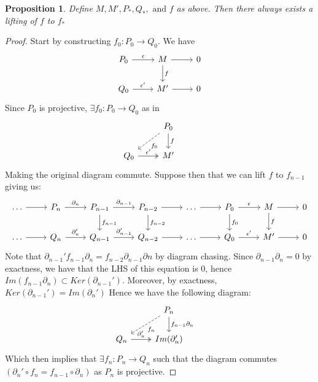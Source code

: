\documentclass[12pt]{book}
\newtheorem{proposition}[theorem]{Proposition}
\theoremstyle{definition}
\begin{document}
\begin{proposition}\label{Lifting of Chain Complexes}
    Define $M, M', P_*, Q_*, \text{ and } f$ as above. Then there always exists a lifting of $f$ to $f_*$
\end{proposition}
\begin{proof}
    Start by constructing $f_0 : P_0 \to Q_0$. We have 
    \[
    \begin{tikzcd}
        P_0 \arrow[r, "\epsilon"]  & M \arrow[r] \arrow[d, "f"]
        & 0\\
        Q_0 \arrow[r, "\epsilon'"] & M' \arrow[r] 
        & 0 
    \end{tikzcd}
    \]
    Since $P_0$ is projective, $\exists f_0 : P_0 \to Q_0$ as in 
    \[
    \begin{tikzcd}
    & P_0 \arrow[ld, dashed, "f_0"] \arrow[d, "f"] & \\
    Q_0 \arrow[r, two heads, "\epsilon'"] & M' &
    \end{tikzcd}
    \]
    Making the original diagram commute. Suppose then that we can lift $f$ to $f_{n-1}$ giving us: 
    \[
    \begin{tikzcd}
    \dots \arrow[r] & P_n \arrow[r, "\partial_n"]  
    & P_{n-1} \arrow[r, "\partial_{n-1}"] \arrow[d, "f_{n-1}"]
    & P_{n-2} \arrow[r] \arrow[d, "f_{n-2}"] 
    & \dots \arrow[r]
    & P_0 \arrow[r, "\epsilon"] \arrow[d, "f_0"]
    & M \arrow[r] \arrow[d, "f"]
    & 0 \\
    \dots \arrow[r] & Q_n \arrow[r, "\partial_n'"] 
    & Q_{n-1} \arrow[r, "\partial_{n-1}'"]
    & Q_{n-2} \arrow[r]
    & \dots \arrow[r]
    & Q_0 \arrow[r, "\epsilon'"]
    & M' \arrow[r] 
    & 0
    \end{tikzcd}
    \]
    Note that $\partial_{n-1}' f_{n-1} \partial_n = f_{n-2}\partial_{n-1}\partial{n}$ by diagram chasing. Since $\partial_{n-1}\partial_n = 0$ by exactness, we have that the LHS of this equation is 0, hence $Im(f_{n-1}\partial_n) \subset Ker(\partial_{n-1}')$. Moreover, by exactness, $Ker(\partial_{n-1}') = Im(\partial_n')$ Hence we have the following diagram: 
    \[
    \begin{tikzcd}
    & P_n \arrow[ld, dashed, "f_n"] \arrow[d, "f_{n-1}\partial_n"] & \\
    Q_n \arrow[r, two heads, "\partial_n'"] & Im(\partial_n') &
    \end{tikzcd}
    \]
    Which then implies that $\exists f_n: P_n \to Q_n$ such that the diagram commutes $(\partial_n' \circ f_n = f_{n-1}\circ \partial_n)$ as $P_n$ is projective. 
\end{proof}
\end{document}

